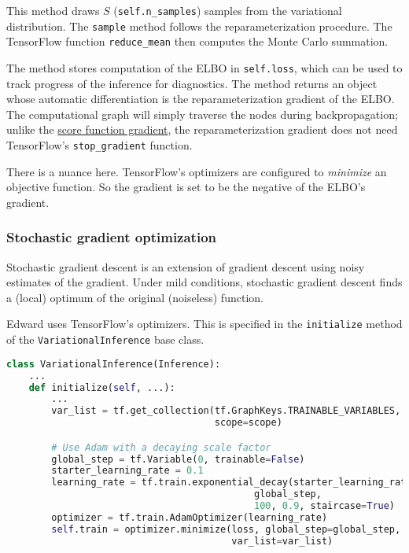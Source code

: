 This method draws $S$ (\texttt{self.n_samples}) samples from the variational
distribution. The \texttt{sample} method follows the reparameterization
procedure. The TensorFlow function \texttt{reduce_mean} then
computes the Monte Carlo summation.

The method stores computation of the ELBO in \texttt{self.loss}, which
can be used to track progress of the inference for diagnostics.  The
method returns an object whose automatic differentiation is the
reparameterization gradient of the ELBO. The computational graph will
simply traverse the nodes during backpropagation; unlike the
\href{tut_KLqp_score.html}{score function gradient}, the
reparameterization gradient does not need TensorFlow's
\texttt{stop_gradient} function.

There is a nuance here. TensorFlow's optimizers are configured to
\emph{minimize} an objective function. So the gradient is set to be
the negative of the ELBO's gradient.

\subsubsection{Stochastic gradient optimization}

Stochastic gradient descent is an extension of gradient descent using
noisy estimates of the gradient. Under mild conditions, stochastic
gradient descent finds a (local) optimum of the original (noiseless)
function.

Edward uses TensorFlow's optimizers.
This is specified in the \texttt{initialize} method of the
\texttt{VariationalInference} base class.

\begin{lstlisting}[language=Python]
class VariationalInference(Inference):
    ...
    def initialize(self, ...):
        ...
        var_list = tf.get_collection(tf.GraphKeys.TRAINABLE_VARIABLES,
                                     scope=scope)

        # Use Adam with a decaying scale factor
        global_step = tf.Variable(0, trainable=False)
        starter_learning_rate = 0.1
        learning_rate = tf.train.exponential_decay(starter_learning_rate,
                                            global_step,
                                            100, 0.9, staircase=True)
        optimizer = tf.train.AdamOptimizer(learning_rate)
        self.train = optimizer.minimize(loss, global_step=global_step,
                                        var_list=var_list)
\end{lstlisting}

